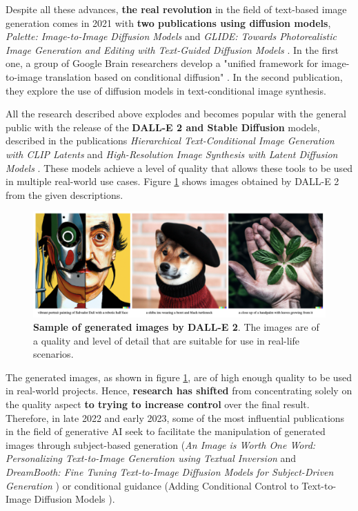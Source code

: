 Despite all these advances, \textbf{the real revolution} in the field of text-based image generation comes in 2021 with \textbf{two publications using diffusion models}, \textit{Palette: Image-to-Image Diffusion Models} \cite{saharia2022palette} and \textit{GLIDE: Towards Photorealistic Image Generation and Editing with Text-Guided Diffusion Models} \cite{nichol2021glide}. In the first one, a group of Google Brain researchers develop a "unified framework for image-to-image translation based on conditional diffusion" \cite{saharia2022palette}. In the second publication, they explore the use of diffusion models in text-conditional image synthesis. 

All the research described above explodes and becomes popular with the general public with the release of the \textbf{DALL-E 2 and Stable Diffusion} models, described in the publications \textit{Hierarchical Text-Conditional Image Generation with CLIP Latents} \cite{ramesh2022hierarchical} and \textit{High-Resolution Image Synthesis with Latent Diffusion Models} \cite{rombach2022high}. These models achieve a level of quality that allows these tools to be used in multiple real-world use cases. Figure \ref{fig:DallE2} shows images obtained by DALL-E 2 from the given descriptions. 

\begin{figure}
    \centering
    \includegraphics[width=1\textwidth]{Pictures/DallE2.png} 
    \caption{\textbf{Sample of generated images by DALL-E 2}. The images are of a quality and level of detail that are suitable for use in real-life scenarios. \cite{ramesh2022hierarchical}}
    \label{fig:DallE2}
\end{figure}

The generated images, as shown in figure \ref{fig:DallE2}, are of high enough quality to be used in real-world projects. Hence, \textbf{research has shifted} from concentrating solely on the quality aspect \textbf{to trying to increase control} over the final result. Therefore, in late 2022 and early 2023, some of the most influential publications in the field of generative AI seek to facilitate the manipulation of generated images through subject-based generation (\textit{\textit{An Image is Worth One Word: Personalizing Text-to-Image Generation using Textual Inversion}} \cite{gal2022image} and \textit{DreamBooth: Fine Tuning Text-to-Image Diffusion Models for Subject-Driven Generation} \cite{ruiz2022dreambooth}) or conditional guidance (Adding Conditional Control to Text-to-Image Diffusion Models \cite{zhang2023adding}).

